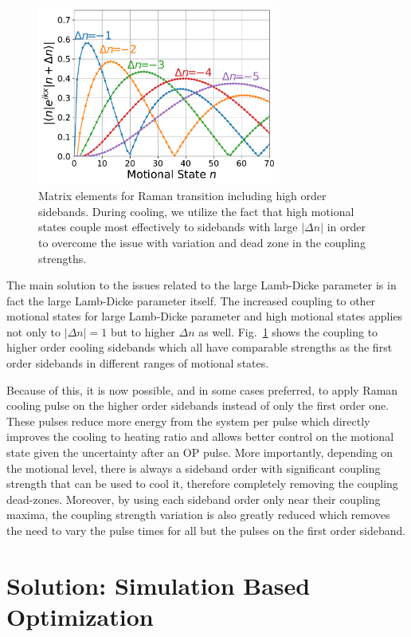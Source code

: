 \begin{figure}
  \centering
  \includegraphics[width=8cm]{figures/na_rsc_mele_raman.pdf}
  \caption[Raman coupling including high order sidebands]{
    Matrix elements for Raman transition including high order sidebands.
    During cooling, we utilize the fact that high motional states couple most effectively
    to sidebands with large $|\Delta n|$ in order to overcome the issue with
    variation and dead zone in the coupling strengths.
    \label{fig:rsc:na-mele-raman}}
\end{figure}

The main solution to the issues related to the large Lamb-Dicke parameter
is in fact the large Lamb-Dicke parameter itself.
The increased coupling to other motional states for large Lamb-Dicke parameter
and high motional states applies not only to $|\Delta n|=1$ but to higher $\Delta n$ as well.
Fig.~\ref{fig:rsc:na-mele-raman} shows the coupling to higher order cooling sidebands
which all have comparable strengths as the first order sidebands in different ranges
of motional states.

Because of this, it is now possible, and in some cases preferred, to apply Raman cooling pulse
on the higher order sidebands instead of only the first order one.
These pulses reduce more energy from the system per pulse which directly improves
the cooling to heating ratio and allows better control on the motional state
given the uncertainty after an OP pulse.
More importantly, depending on the motional level, there is always a sideband order
with significant coupling strength that can be used to cool it,
therefore completely removing the coupling dead-zones.
Moreover, by using each sideband order only near their coupling maxima,
the coupling strength variation is also greatly reduced which removes
the need to vary the pulse times for all but the pulses on the first order sideband.

\section{Solution: Simulation Based Optimization}
\label{ch:rsc:simulation}

